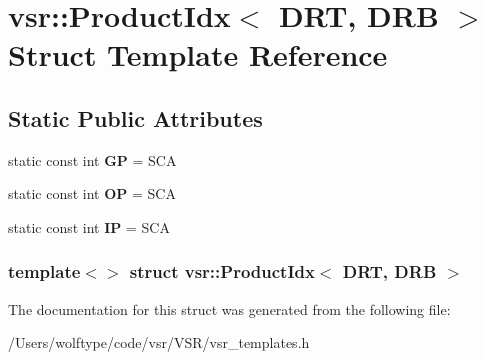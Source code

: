 \hypertarget{structvsr_1_1_product_idx_3_01_d_r_t_00_01_d_r_b_01_4}{\section{vsr\-:\-:Product\-Idx$<$ D\-R\-T, D\-R\-B $>$ Struct Template Reference}
\label{structvsr_1_1_product_idx_3_01_d_r_t_00_01_d_r_b_01_4}
}
\subsection*{Static Public Attributes}
\begin{DoxyCompactItemize}
\item 
\hypertarget{structvsr_1_1_product_idx_3_01_d_r_t_00_01_d_r_b_01_4_aa51939f24c9a65373d9214982e351088}{static const int {\bfseries G\-P} = S\-C\-A}\label{structvsr_1_1_product_idx_3_01_d_r_t_00_01_d_r_b_01_4_aa51939f24c9a65373d9214982e351088}

\item 
\hypertarget{structvsr_1_1_product_idx_3_01_d_r_t_00_01_d_r_b_01_4_afd66eb79fdaeb57329737a311f0e5de3}{static const int {\bfseries O\-P} = S\-C\-A}\label{structvsr_1_1_product_idx_3_01_d_r_t_00_01_d_r_b_01_4_afd66eb79fdaeb57329737a311f0e5de3}

\item 
\hypertarget{structvsr_1_1_product_idx_3_01_d_r_t_00_01_d_r_b_01_4_a9981aff984073c7ecc748806aa77dfa1}{static const int {\bfseries I\-P} = S\-C\-A}\label{structvsr_1_1_product_idx_3_01_d_r_t_00_01_d_r_b_01_4_a9981aff984073c7ecc748806aa77dfa1}

\end{DoxyCompactItemize}
\subsubsection*{template$<$$>$ struct vsr\-::\-Product\-Idx$<$ D\-R\-T, D\-R\-B $>$}



The documentation for this struct was generated from the following file\-:\begin{DoxyCompactItemize}
\item 
/\-Users/wolftype/code/vsr/\-V\-S\-R/vsr\-\_\-templates.\-h\end{DoxyCompactItemize}
